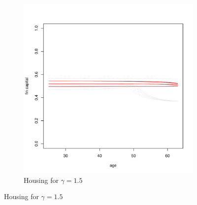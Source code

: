 \begin{figure}[H]
\begin{subfigure}{0.45\textwidth}
		\includegraphics[scale=0.25]{figs/hmunkhouse15.pdf}
		\caption{Housing for $\gamma = 1.5$}
	\end{subfigure}
\end{figure}
